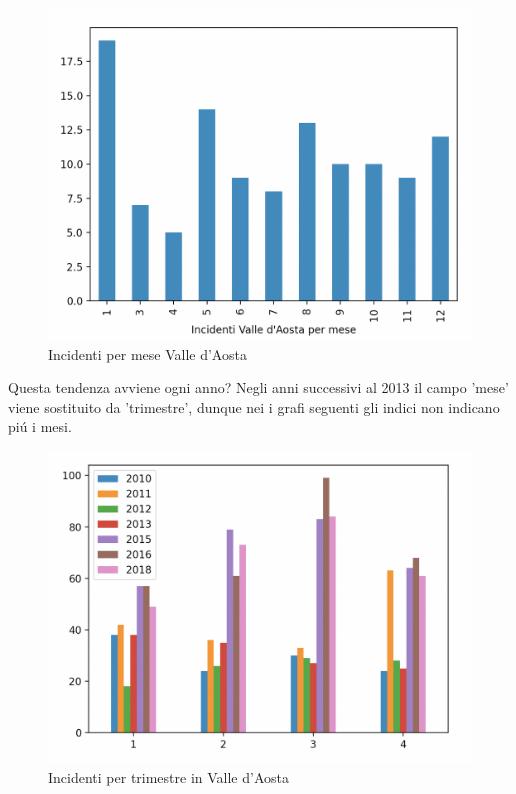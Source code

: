 \documentclass[a4paper]{report}
\begin{document}
\begin{figure}[!ht]
    \includegraphics[width=\linewidth]{../src/incidenti/incidenti_senza_coords/mese_incidenti/valle_aosta.png}
    \caption{Incidenti per mese Valle d'Aosta}
    \label{fig:aosta}
\end{figure}

Questa tendenza avviene ogni anno?
Negli anni successivi al 2013 il campo 'mese' viene sostituito da 'trimestre', 
dunque nei i grafi seguenti gli indici non indicano pi\'u i mesi.

\begin{figure}[!ht]
    \includegraphics[width=\linewidth]{../src/incidenti/incidenti_senza_coords/mese_incidenti/aosta_timestre.png}
    \caption{Incidenti per trimestre in Valle d'Aosta}
    \label{fig:aosta_trimestre}
\end{figure}
\end{document}
